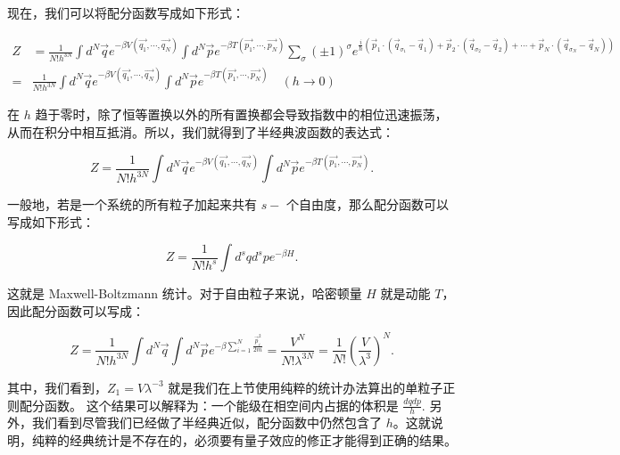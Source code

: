 现在，我们可以将配分函数写成如下形式：
\begin{linenomath}\begin{equation}
    \begin{aligned}
            Z &= \frac{1}{N!h^{3N}} \int d^N\vec{q} e^{-\beta V(\vec{q_1},\cdots,\vec{q_N})} \int d^N\vec{p} e^{-\beta T(\vec{p_1},\cdots,\vec{p_N})} \sum_{\sigma}\left( \pm 1 \right)^{\sigma} e^{\frac{i}{\hbar}(\vec{p}_1\cdot\left( \vec{q}_{\sigma_1}-\vec{q}_1 \right) + \vec{p}_2\cdot\left( \vec{q}_{\sigma_2}-\vec{q}_2 \right) + \cdots + \vec{p}_N\cdot\left( \vec{q}_{\sigma_N}-\vec{q}_N \right))} 
    \\ =& \frac{1}{N!h^{3N}} \int d^N\vec{q} e^{-\beta V(\vec{q_1},\cdots,\vec{q_N})} \int d^N\vec{p} e^{-\beta T(\vec{p_1},\cdots,\vec{p_N})} \quad \left( h \to 0 \right)
    \end{aligned}
\end{equation}\end{linenomath}
在 $h$ 趋于零时，除了恒等置换以外的所有置换都会导致指数中的相位迅速振荡，从而在积分中相互抵消。所以，我们就得到了半经典波函数的表达式：
\begin{linenomath}\begin{equation}
    \boxed{Z = \frac{1}{N!h^{3N}} \int d^N\vec{q} e^{-\beta V(\vec{q_1},\cdots,\vec{q_N})} \int d^N\vec{p} e^{-\beta T(\vec{p_1},\cdots,\vec{p_N})}}.
\end{equation}\end{linenomath}
一般地，若是一个系统的所有粒子加起来共有 $s-$ 个自由度，那么配分函数可以写成如下形式：
\begin{linenomath}\begin{equation}
    \boxed{Z = \frac{1}{N!h^s} \int d^s q d^s p e^{-\beta H}}.
\end{equation}\end{linenomath}
这就是 Maxwell-Boltzmann 统计。对于自由粒子来说，哈密顿量 $H$ 就是动能 $T$，因此配分函数可以写成：
\begin{linenomath}\begin{equation}
    Z = \frac{1}{N!h^{3N}} \int d^N\vec{q} \int d^N\vec{p} e^{-\beta \sum_{i=1}^N \frac{\vec{p}_i^2}{2m}} = \frac{V^N}{N!\lambda^{3N}} = \frac{1}{N!} \left( \frac{V}{\lambda^3} \right)^N.
\end{equation}\end{linenomath}
其中，我们看到，$Z_1 = V\lambda^{-3}$ 就是我们在上节使用纯粹的统计办法算出的单粒子正则配分函数。
这个结果可以解释为：一个能级在相空间内占据的体积是 $\frac{dqdp}{h}.$ 另外，我们看到尽管我们已经做了半经典近似，配分函数中仍然包含了 $h$。这就说明，纯粹的经典统计是不存在的，必须要有量子效应的修正才能得到正确的结果。
